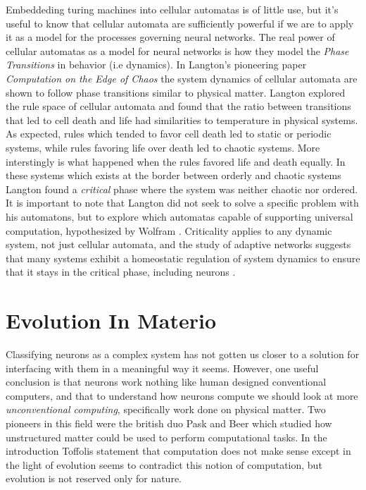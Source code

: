 Embeddeding turing machines into cellular automatas is of little use, but it's
useful to know that cellular automata are sufficiently powerful if we are to
apply it as a model for the processes governing neural networks.
The real power of cellular automatas as a model for neural networks is how they
model the \emph{Phase Transitions} in behavior (i.e dynamics).
In Langton's pioneering paper \emph{Computation on the Edge of Chaos}
\cite{langton_computation_1990}
the system dynamics of cellular automata are shown to follow phase transitions
similar to physical matter.
Langton explored the rule space of cellular automata and found that the ratio
between transitions that led to cell death and life had similarities to
temperature in physical systems.
As expected, rules which tended to favor cell death led to static or periodic
systems, while rules favoring life over death led to chaotic systems.
More interstingly is what happened when the rules favored life and death
equally.
In these systems which exists at the border between orderly and chaotic systems
Langton found a \emph{critical} phase where the system was neither chaotic nor
ordered.
It is important to note that Langton did not seek to solve a specific problem
with his automatons, but to explore which automatas capable of supporting
universal computation, hypothesized by Wolfram \cite{wolfram_universality_1984}.
Criticality applies to any dynamic system, not just cellular automata, and the
study of adaptive networks \cite{sayama_modeling_2013} suggests that many
systems exhibit a homeostatic regulation of system dynamics to ensure that it
stays in the critical phase, including neurons
\cite{bornholdt_topological_2000}.

\section{Evolution In Materio}
Classifying neurons as a complex system has not gotten us closer to a solution
for interfacing with them in a meaningful way it seems.
However, one useful conclusion is that neurons work nothing like human designed
conventional computers, and that to understand how neurons compute we should
look at more \emph{unconventional computing}, specifically work done on physical
matter.
Two pioneers in this field were the british duo Pask and Beer which studied how
unstructured matter could be used to perform computational tasks.
In the introduction Toffolis statement that computation does not make sense
except in the light of evolution seems to contradict this notion of computation,
but evolution is not reserved only for nature.

